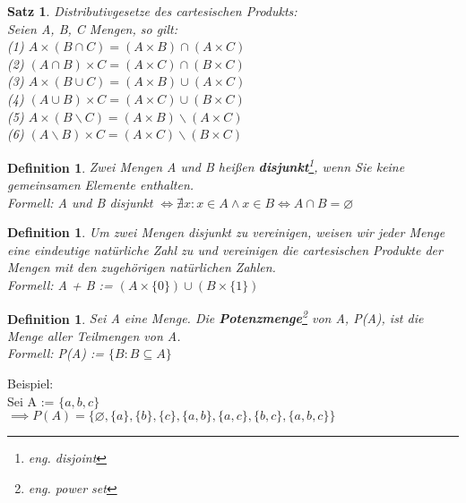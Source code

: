 \documentclass[12pt,german,a4]{article}
\begin{document}
\newtheorem{satz5}[satz]{Satz}
\begin{satz5}
Distributivgesetze des cartesischen Produkts:\\
Seien A, B, C Mengen, so gilt:\\
(1) $A \times (B \cap C) = (A \times B) \cap (A \times C)$\\
(2) $(A \cap B) \times C = (A \times C) \cap (B \times C)$\\
(3) $A \times (B \cup C) = (A \times B) \cup (A \times C)$\\
(4) $(A \cup B) \times C = (A \times C) \cup (B \times C)$\\
(5) $A \times (B \backslash C) = (A \times B) \backslash (A \times C)$\\
(6) $(A \backslash B) \times C = (A \times C) \backslash (B \times C)$
\end{satz5}

\newtheorem{defDisjoint}[defSet]{Definition}
\begin{defDisjoint}
Zwei Mengen A und B heißen {\bf disjunkt}\footnote{eng. disjoint}, wenn Sie keine gemeinsamen Elemente enthalten.\\
Formell: A und B disjunkt $\Leftrightarrow \nexists x: x \in A \wedge x \in B \Leftrightarrow A \cap B = \varnothing$
\end{defDisjoint}

\pagebreak

\newtheorem{defDisjointUnion}[defSet]{Definition}
\begin{defDisjointUnion}
Um zwei Mengen disjunkt zu vereinigen, weisen wir jeder Menge eine eindeutige natürliche Zahl zu und vereinigen die cartesischen Produkte der Mengen mit den zugehörigen natürlichen Zahlen.\\
Formell: A + B := $(A \times \{0\}) \cup (B \times \{1\})$
\end{defDisjointUnion}

\newtheorem{defPowerSet}[defSet]{Definition}
\begin{defPowerSet}
Sei A eine Menge. Die {\bf Potenzmenge}\footnote{eng. power set} von A, P(A), ist die Menge aller Teilmengen von A.\\
Formell: P(A) := $\{B: B \subseteq A\}$
\end{defPowerSet}

Beispiel:\\
Sei A := $\{a, b, c\}$\\
$\implies P(A) = \{\varnothing, \{a\}, \{b\}, \{c\}, \{a, b\}, \{a, c\}, \{b, c\}, \{a, b, c\}\}$
\end{document}
